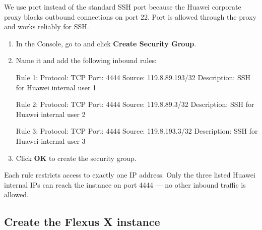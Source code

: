 \documentclass{guide}
\begin{document}
\begin{infobox}
We use port  instead of the standard SSH port  because
the Huawei corporate proxy blocks outbound connections on port 22. Port
 is allowed through the proxy and works reliably for SSH.
\end{infobox}

\stepbystep
\begin{enumerate}
  \item In the Console, go to 
        and click \textbf{Create Security Group}.
  \item Name it  and add the following inbound rules:

  \begin{code}
Rule 1:
  Protocol:    TCP
  Port:        4444
  Source:      119.8.89.193/32
  Description: SSH for Huawei internal user 1

Rule 2:
  Protocol:    TCP
  Port:        4444
  Source:      119.8.89.3/32
  Description: SSH for Huawei internal user 2

Rule 3:
  Protocol:    TCP
  Port:        4444
  Source:      119.8.193.3/32
  Description: SSH for Huawei internal user 3
  \end{code}

  \item Click \textbf{OK} to create the security group.
\end{enumerate}

\begin{tip}
Each  rule restricts access to exactly one IP address. Only the
three listed Huawei internal IPs can reach the instance on port 4444 --- no other
inbound traffic is allowed.
\end{tip}

\subsection{Create the Flexus X instance}

\end{document}
